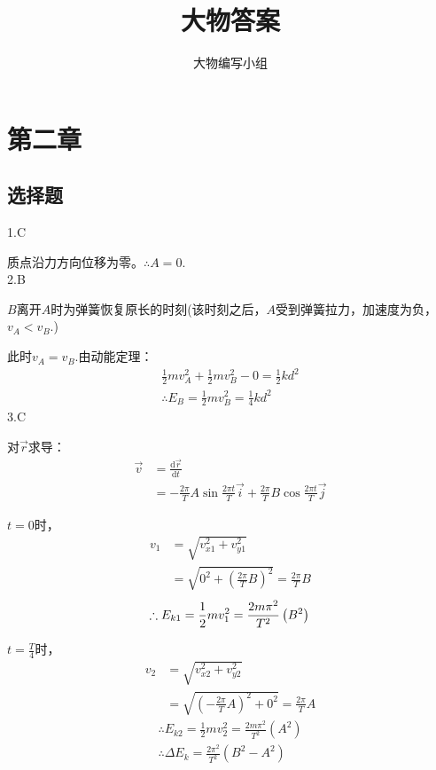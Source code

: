 \documentclass[blue, pad]{./templete/qyxfnote}
\title{大物答案}
\institute{小破楼资料编写小组\LaTeX}
\author{大物编写小组}
\newcommand{\di}[1]{\mathrm{d}#1}
\begin{document}
	\maketitle
	\newpage
	\tableofcontents
	\newpage
	

	\section{第二章}
	\subsection{选择题}
	
	1.C\par
	质点沿力方向位移为零。$\therefore A=0$.\\
	2.B\par
	$B$离开$A$时为弹簧恢复原长的时刻(该时刻之后，$A$受到弹簧拉力，加速度为负，$v_A<v_B$.)\par
	此时$v_A=v_B$.由动能定理：
	\begin{align*}
	\frac{1}{2}mv_A^2+\frac{1}{2}mv_B^2-0=\frac{1}{2}kd^2\\
	\therefore{}E_B=\frac{1}{2}mv_B^2=\frac{1}{4}kd^2
	\end{align*}
	3.C\par
	对$\vec{r}$求导：
	\begin{align*}
	\vec{v}&=\frac{\di{\vec{r}}}{\di{t}}\\
	&=-\frac{2\pi}{T}A\sin\frac{2\pi t}{T}\vec{i}+\frac{2\pi}{T}B\cos\frac{2\pi t}{T}\vec{j}
	\end{align*}
	\par$t=0$时，
	\begin{align*}
	v_1&=\sqrt{v_{x1}^2+v_{y1}^2}\\
	&=\sqrt{0^2+\left(\frac{2\pi}{T}B\right)^2}=\frac{2\pi}{T}B
	\end{align*}
	\[\therefore{}E_{k1}=\frac{1}{2}mv_1^2=\frac{2m\pi^2}{T^2}\left(B^2\right)\\\]
	\par$t=\frac{T}{4}$时，
	\begin{align*}
	v_2&=\sqrt{v_{x2}^2+v_{y2}^2}\\
	&=\sqrt{\left(-\frac{2\pi}{T}A\right)^2+0^2}=\frac{2\pi}{T}A
	\end{align*}
	\begin{gather*}
	\therefore{}E_{k2}=\frac{1}{2}mv_2^2=\frac{2m\pi^2}{T^2}\left(A^2\right)\\
	\therefore\Delta{}E_k=\frac{2\pi^2}{T^2}(B^2-A^2)
	\end{gather*}
\end{document}
